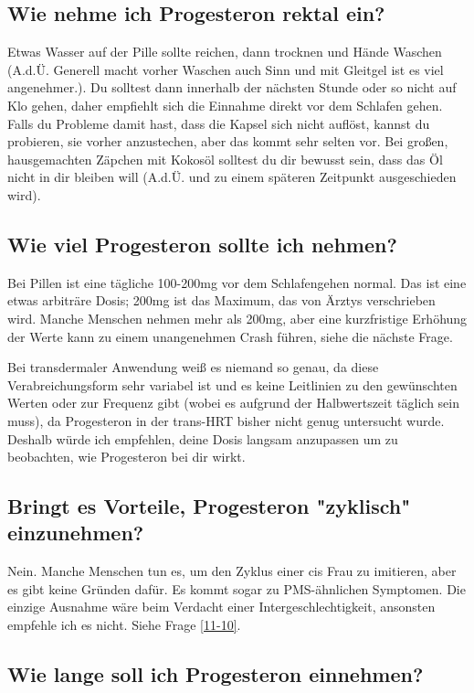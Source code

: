 \documentclass{article}
\begin{document}
\subsection{Wie nehme ich Progesteron rektal ein?}

Etwas Wasser auf der Pille sollte reichen, dann trocknen und Hände Waschen (A.d.Ü. Generell macht vorher Waschen auch Sinn und mit Gleitgel ist es viel angenehmer.). Du solltest dann innerhalb der nächsten Stunde oder so nicht auf Klo gehen, daher empfiehlt sich die Einnahme direkt vor dem Schlafen gehen. Falls du Probleme damit hast, dass die Kapsel sich nicht auflöst, kannst du probieren, sie vorher anzustechen, aber das kommt sehr selten vor. Bei großen, hausgemachten Zäpchen mit Kokosöl solltest du dir bewusst sein, dass das Öl nicht in dir bleiben will (A.d.Ü. und zu einem späteren Zeitpunkt ausgeschieden wird).

\subsection{Wie viel Progesteron sollte ich nehmen?}

Bei Pillen ist eine tägliche 100-200mg vor dem Schlafengehen normal. Das ist eine etwas arbiträre Dosis; 200mg ist das Maximum, das von Ärztys verschrieben wird. Manche Menschen nehmen mehr als 200mg, aber eine kurzfristige Erhöhung der Werte kann zu einem unangenehmen Crash führen, siehe die nächste Frage.

Bei transdermaler Anwendung weiß es niemand so genau, da diese Verabreichungsform sehr variabel ist und es keine Leitlinien zu den gewünschten Werten oder zur Frequenz gibt (wobei es aufgrund der Halbwertszeit täglich sein muss), da Progesteron in der trans-HRT bisher nicht genug untersucht wurde. Deshalb würde ich empfehlen, deine Dosis langsam anzupassen um zu beobachten, wie Progesteron bei dir wirkt.

\subsection{Bringt es Vorteile, Progesteron "zyklisch" einzunehmen?}\label{8-11}

Nein. Manche Menschen tun es, um den Zyklus einer cis Frau zu imitieren, aber es gibt keine Gründen dafür. Es kommt sogar zu PMS-ähnlichen Symptomen. Die einzige Ausnahme wäre beim Verdacht einer Intergeschlechtigkeit, ansonsten empfehle ich es nicht. Siehe Frage \ref{11-10}.

\subsection{Wie lange soll ich Progesteron einnehmen?}
\end{document}
